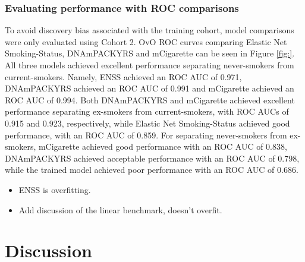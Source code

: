 \documentclass[draft]{article}
\begin{document}
\subsubsection{Evaluating performance with ROC comparisons}
To avoid discovery bias associated with the training cohort, model comparisons were only evaluated using Cohort 2. OvO ROC curves comparing Elastic Net Smoking-Status, DNAmPACKYRS and mCigarette can be seen in Figure \ref{fig:}. All three models achieved excellent performance separating never-smokers from current-smokers. Namely, ENSS achieved an ROC AUC of 0.971, DNAmPACKYRS achieved an ROC AUC of 0.991 and mCigarette achieved an ROC AUC of 0.994. Both DNAmPACKYRS and mCigarette achieved excellent performance separating ex-smokers from current-smokers, with ROC AUCs of 0.915 and 0.923, respectively, while Elastic Net Smoking-Status achieved good performance, with an ROC AUC of 0.859. For separating never-smokers from ex-smokers, mCigarette achieved good performance with an ROC AUC of 0.838, DNAmPACKYRS achieved acceptable performance with an ROC AUC of 0.798, while the trained model achieved poor performance with an ROC AUC of 0.686. 

\begin{itemize}
    \item ENSS is overfitting.
    \item Add discussion of the linear benchmark, doesn't overfit. 
\end{itemize}

\section{Discussion}
\end{document}

